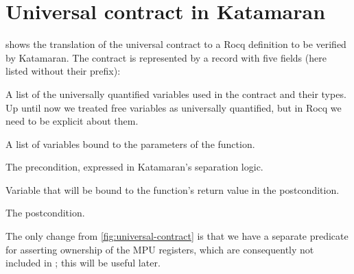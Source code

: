 \section{Universal contract in Katamaran}

 shows the translation of the universal contract to a Rocq definition to be verified by Katamaran. The contract is represented by a record with five fields (here listed without their  prefix):
\begin{labeling}{}
\item[\coq{logic_variables}] A list of the universally quantified variables used in the contract and their types. Up until now we treated free variables as universally quantified, but in Rocq we need to be explicit about them.
\item[\coq{localstore}] A list of variables bound to the parameters of the function.
\item[\coq{precondition}] The precondition, expressed in Katamaran's separation logic.

\item[\coq{result}] Variable that will be bound to the function's return value in the postcondition.
\item[\coq{postcondition}] The postcondition.
\end{labeling}

The only change from \cref{fig:universal-contract} is that we have a separate predicate  for asserting ownership of the MPU registers, which are consequently not included in ; this will be useful later.

